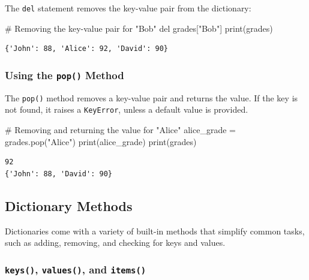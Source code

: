 \documentclass[
  letterpaper,
  DIV=11,
  numbers=noendperiod]{scrreprt}
\newenvironment{Shaded}{\begin{snugshade}}{\end{snugshade}}
\newcommand{\BuiltInTok}[1]{\textcolor[rgb]{0.00,0.23,0.31}{#1}}
\newcommand{\CommentTok}[1]{\textcolor[rgb]{0.37,0.37,0.37}{#1}}
\newcommand{\KeywordTok}[1]{\textcolor[rgb]{0.00,0.23,0.31}{#1}}
\newcommand{\NormalTok}[1]{\textcolor[rgb]{0.00,0.23,0.31}{#1}}
\newcommand{\OperatorTok}[1]{\textcolor[rgb]{0.37,0.37,0.37}{#1}}
\newcommand{\StringTok}[1]{\textcolor[rgb]{0.13,0.47,0.30}{#1}}
\begin{document}
The \texttt{del} statement removes the key-value pair from the
dictionary:

\begin{Shaded}
\begin{Highlighting}[]
\CommentTok{\# Removing the key{-}value pair for "Bob"}
\KeywordTok{del}\NormalTok{ grades[}\StringTok{"Bob"}\NormalTok{]}
\BuiltInTok{print}\NormalTok{(grades) }
\end{Highlighting}
\end{Shaded}

\begin{verbatim}
{'John': 88, 'Alice': 92, 'David': 90}
\end{verbatim}

\hypertarget{using-the-pop-method}{%
\subsubsection{\texorpdfstring{Using the \texttt{pop()}
Method}{Using the pop() Method}}\label{using-the-pop-method}}

The \texttt{pop()} method removes a key-value pair and returns the
value. If the key is not found, it raises a \texttt{KeyError}, unless a
default value is provided.

\begin{Shaded}
\begin{Highlighting}[]
\CommentTok{\# Removing and returning the value for "Alice"}
\NormalTok{alice\_grade }\OperatorTok{=}\NormalTok{ grades.pop(}\StringTok{"Alice"}\NormalTok{)}
\BuiltInTok{print}\NormalTok{(alice\_grade)}
\BuiltInTok{print}\NormalTok{(grades)  }
\end{Highlighting}
\end{Shaded}

\begin{verbatim}
92
{'John': 88, 'David': 90}
\end{verbatim}

\hypertarget{dictionary-methods}{%
\subsection{Dictionary Methods}\label{dictionary-methods}}

Dictionaries come with a variety of built-in methods that simplify
common tasks, such as adding, removing, and checking for keys and
values.

\hypertarget{keys-values-and-items}{%
\subsubsection{\texorpdfstring{\texttt{keys()}, \texttt{values()}, and
\texttt{items()}}{keys(), values(), and items()}}\label{keys-values-and-items}}
\end{document}
